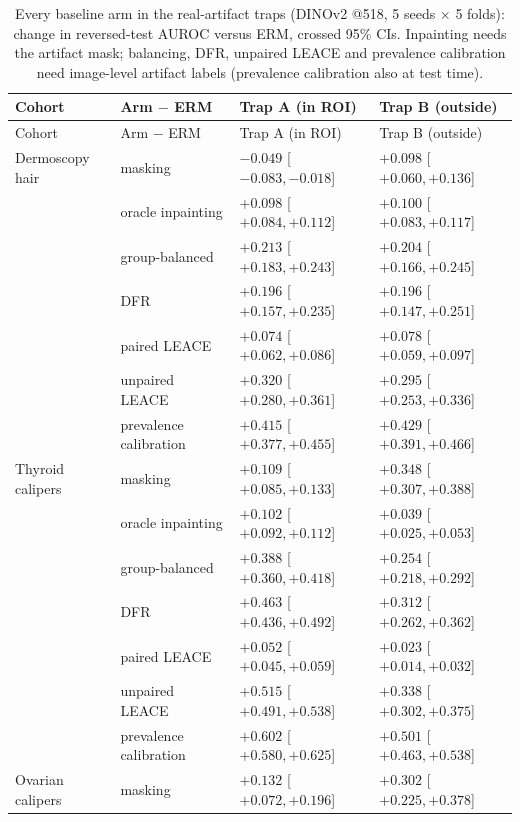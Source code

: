 {\scriptsize
\begin{longtable}{p{2.6cm}p{3.4cm}p{4.0cm}p{4.0cm}}
\caption{Every baseline arm in the real-artifact traps (DINOv2 @518, 5 seeds $\times$ 5 folds): change in reversed-test AUROC versus ERM, crossed 95\% CIs. Inpainting needs the artifact mask; balancing, DFR, unpaired LEACE and prevalence calibration need image-level artifact labels (prevalence calibration also at test time).}\label{tab:allarms}\\\toprule
Cohort & Arm $-$ ERM & Trap A (in ROI) & Trap B (outside) \\\midrule
\endfirsthead
\toprule Cohort & Arm $-$ ERM & Trap A (in ROI) & Trap B (outside) \\\midrule
\endhead
\bottomrule
\endlastfoot
Dermoscopy hair & masking & $-0.049$ [$-0.083, -0.018$] & $+0.098$ [$+0.060, +0.136$] \\
 & oracle inpainting & $+0.098$ [$+0.084, +0.112$] & $+0.100$ [$+0.083, +0.117$] \\
 & group-balanced & $+0.213$ [$+0.183, +0.243$] & $+0.204$ [$+0.166, +0.245$] \\
 & DFR & $+0.196$ [$+0.157, +0.235$] & $+0.196$ [$+0.147, +0.251$] \\
 & paired LEACE & $+0.074$ [$+0.062, +0.086$] & $+0.078$ [$+0.059, +0.097$] \\
 & unpaired LEACE & $+0.320$ [$+0.280, +0.361$] & $+0.295$ [$+0.253, +0.336$] \\
 & prevalence calibration & $+0.415$ [$+0.377, +0.455$] & $+0.429$ [$+0.391, +0.466$] \\
Thyroid calipers & masking & $+0.109$ [$+0.085, +0.133$] & $+0.348$ [$+0.307, +0.388$] \\
 & oracle inpainting & $+0.102$ [$+0.092, +0.112$] & $+0.039$ [$+0.025, +0.053$] \\
 & group-balanced & $+0.388$ [$+0.360, +0.418$] & $+0.254$ [$+0.218, +0.292$] \\
 & DFR & $+0.463$ [$+0.436, +0.492$] & $+0.312$ [$+0.262, +0.362$] \\
 & paired LEACE & $+0.052$ [$+0.045, +0.059$] & $+0.023$ [$+0.014, +0.032$] \\
 & unpaired LEACE & $+0.515$ [$+0.491, +0.538$] & $+0.338$ [$+0.302, +0.375$] \\
 & prevalence calibration & $+0.602$ [$+0.580, +0.625$] & $+0.501$ [$+0.463, +0.538$] \\
Ovarian calipers & masking & $+0.132$ [$+0.072, +0.196$] & $+0.302$ [$+0.225, +0.378$] \\

\end{longtable}}
